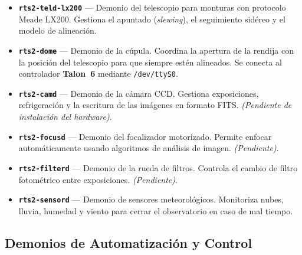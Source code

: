 \documentclass[12pt,a4paper,titlepage]{article}
\begin{document}
\begin{itemize}
  \item \textbf{\texttt{rts2-teld-lx200}} --- Demonio del telescopio para monturas con protocolo Meade LX200. Gestiona el apuntado (\textit{slewing}), el seguimiento sidéreo y el modelo de alineación.

  \item \textbf{\texttt{rts2-dome}} --- Demonio de la cúpula. Coordina la apertura de la rendija con la posición del telescopio para que siempre estén alineados. Se conecta al controlador \textbf{Talon~6} mediante \texttt{/dev/ttyS0}.

  \item \textbf{\texttt{rts2-camd}} --- Demonio de la cámara CCD. Gestiona exposiciones, refrigeración y la escritura de las imágenes en formato FITS. \textit{(Pendiente de instalación del hardware)}.

  \item \textbf{\texttt{rts2-focusd}} --- Demonio del focalizador motorizado. Permite enfocar automáticamente usando algoritmos de análisis de imagen. \textit{(Pendiente)}.

  \item \textbf{\texttt{rts2-filterd}} --- Demonio de la rueda de filtros. Controla el cambio de filtro fotométrico entre exposiciones. \textit{(Pendiente)}.

  \item \textbf{\texttt{rts2-sensord}} --- Demonio de sensores meteorológicos. Monitoriza nubes, lluvia, humedad y viento para cerrar el observatorio en caso de mal tiempo.
\end{itemize}

\subsection{Demonios de Automatización y Control}
\end{document}
